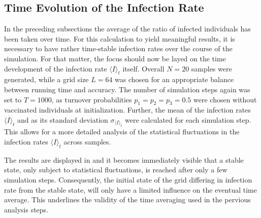 \subsection{Time Evolution of the Infection Rate}

In the preceding subsections the average of the ratio of infected individuals has been taken over time. For this calculation to yield meaningful results, it is necessary to have
rather time-stable infection rates over the course of the simulation. For that matter, the focus should now be layed on the time development of the infection rate $\langle I\rangle_t$ itself.
Overall $N=20$ samples were generated, while a grid size $L=64$ was chosen for an appropriate balance between running time and accuracy. The number of simulation steps again was set to $T=1000$,
as turnover probabilities $p_1=p_2=p_3=0.5$ were chosen without vaccinated individuals at initialization. 
Further, the mean of the infection rates $\overline{\langle I\rangle_t}$ and as its standard deviation $\sigma_{\langle I\rangle_t}$ were calculated for each simulation step. 
This allows for a more detailed analysis of the statistical fluctuations in the infection rates $\langle I\rangle_t$ across samples. 

The results are displayed in  and it becomes immediately visible that a stable state, only subject to statistical fluctuations, is reached after only a few simulation steps.
Consequently, the initial state of the grid differing in infection rate from the stable state, will only have a limited influence on the eventual time average.
This underlines the validity of the time averaging used in the pervious analysis steps.